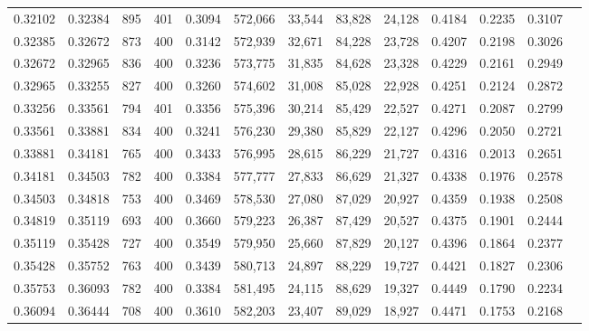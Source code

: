 \begin{tabular}{rrrrrrrrrrrrr}
0.32102 & 0.32384 &    895 & 401 &                                     0.3094 & 572,066 &  33,544 &  83,828 &  24,128 & 0.4184 & 0.2235 & 0.3107 \\
0.32385 & 0.32672 &    873 & 400 &                                     0.3142 & 572,939 &  32,671 &  84,228 &  23,728 & 0.4207 & 0.2198 & 0.3026 \\
0.32672 & 0.32965 &    836 & 400 &                                     0.3236 & 573,775 &  31,835 &  84,628 &  23,328 & 0.4229 & 0.2161 & 0.2949 \\
0.32965 & 0.33255 &    827 & 400 &                                     0.3260 & 574,602 &  31,008 &  85,028 &  22,928 & 0.4251 & 0.2124 & 0.2872 \\
0.33256 & 0.33561 &    794 & 401 &                                     0.3356 & 575,396 &  30,214 &  85,429 &  22,527 & 0.4271 & 0.2087 & 0.2799 \\
0.33561 & 0.33881 &    834 & 400 &                                     0.3241 & 576,230 &  29,380 &  85,829 &  22,127 & 0.4296 & 0.2050 & 0.2721 \\
0.33881 & 0.34181 &    765 & 400 &                                     0.3433 & 576,995 &  28,615 &  86,229 &  21,727 & 0.4316 & 0.2013 & 0.2651 \\
0.34181 & 0.34503 &    782 & 400 &                                     0.3384 & 577,777 &  27,833 &  86,629 &  21,327 & 0.4338 & 0.1976 & 0.2578 \\
0.34503 & 0.34818 &    753 & 400 &                                     0.3469 & 578,530 &  27,080 &  87,029 &  20,927 & 0.4359 & 0.1938 & 0.2508 \\
0.34819 & 0.35119 &    693 & 400 &                                     0.3660 & 579,223 &  26,387 &  87,429 &  20,527 & 0.4375 & 0.1901 & 0.2444 \\
0.35119 & 0.35428 &    727 & 400 &                                     0.3549 & 579,950 &  25,660 &  87,829 &  20,127 & 0.4396 & 0.1864 & 0.2377 \\
0.35428 & 0.35752 &    763 & 400 &                                     0.3439 & 580,713 &  24,897 &  88,229 &  19,727 & 0.4421 & 0.1827 & 0.2306 \\
0.35753 & 0.36093 &    782 & 400 &                                     0.3384 & 581,495 &  24,115 &  88,629 &  19,327 & 0.4449 & 0.1790 & 0.2234 \\
0.36094 & 0.36444 &    708 & 400 &                                     0.3610 & 582,203 &  23,407 &  89,029 &  18,927 & 0.4471 & 0.1753 & 0.2168 \\

\end{tabular}
